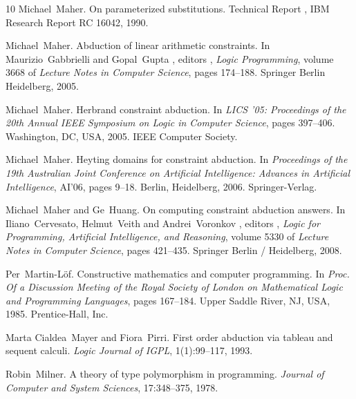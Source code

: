 \documentclass{article}
\newcommand{\tmtextit}[1]{{\itshape{#1}}}
\begin{document}
\begin{thebibliography}{10}
  Michael~Maher.{\newblock} On
  parameterized substitutions.{\newblock} Technical Report , IBM Research
  Report RC 16042, 1990.{\newblock}
  
  Michael~Maher.{\newblock} Abduction of
  linear arithmetic constraints.{\newblock} In  Maurizio~Gabbrielli  and 
  Gopal~Gupta , editors , \tmtextit{Logic Programming},  volume  3668  of
  \tmtextit{Lecture Notes in Computer Science},  pages  174--188. Springer
  Berlin Heidelberg, 2005.{\newblock}
  
  Michael~Maher.{\newblock} Herbrand constraint
  abduction.{\newblock} In \tmtextit{LICS '05: Proceedings of the 20th Annual
  IEEE Symposium on Logic in Computer Science},  pages  397--406. Washington,
  DC, USA, 2005. IEEE Computer Society.{\newblock}
  
  Michael~Maher.{\newblock} Heyting domains for
  constraint abduction.{\newblock} In \tmtextit{Proceedings of the 19th
  Australian Joint Conference on Artificial Intelligence: Advances in
  Artificial Intelligence}, AI'06,  pages  9--18. Berlin, Heidelberg, 2006.
  Springer-Verlag.{\newblock}
  
  Michael~Maher  and  Ge~Huang.{\newblock} On
  computing constraint abduction answers.{\newblock} In  Iliano~Cervesato,
  Helmut~Veith  and  Andrei~Voronkov , editors , \tmtextit{Logic for
  Programming, Artificial Intelligence, and Reasoning},  volume  5330  of
  \tmtextit{Lecture Notes in Computer Science},  pages  421--435. Springer
  Berlin / Heidelberg, 2008.{\newblock}
  
  Per~Martin-L{\"o}f.{\newblock} Constructive
  mathematics and computer programming.{\newblock} In \tmtextit{Proc. Of a
  Discussion Meeting of the Royal Society of London on Mathematical Logic and
  Programming Languages},  pages  167--184. Upper Saddle River, NJ, USA, 1985.
  Prentice-Hall, Inc.{\newblock}
  
  Marta Cialdea~Mayer  and 
  Fiora~Pirri.{\newblock} First order abduction via tableau and sequent
  calculi.{\newblock} \tmtextit{Logic Journal of IGPL}, 1(1):99--117,
  1993.{\newblock}
  
  Robin~Milner.{\newblock} A theory of type polymorphism
  in programming.{\newblock} \tmtextit{Journal of Computer and System
  Sciences}, 17:348--375, 1978.{\newblock}
  

\end{thebibliography}
\end{document}
